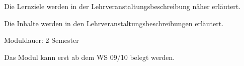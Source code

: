 \begin{module}
\begin{learningoutcomes}
Die Lernziele werden in der Lehrveranstaltungsbeschreibung näher erläutert.


\end{learningoutcomes}

\begin{content}
Die Inhalte werden in den Lehrveranstaltungsbeschreibungen erläutert.


\end{content}

\begin{remarks}Moduldauer: 2 Semester

 

Das Modul kann erst ab dem WS 09/10 belegt werden.

\end{remarks}

\end{module}

